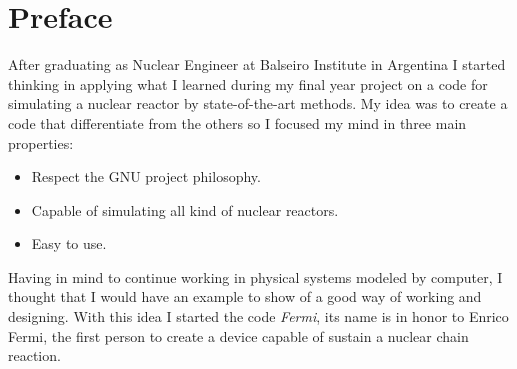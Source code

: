 \chapter*{Preface}

\par
After graduating as Nuclear Engineer at Balseiro Institute in Argentina I started thinking in applying what I learned during my final year project on a code for simulating a nuclear reactor by state-of-the-art methods. My idea was to create a code that differentiate from the others so I focused my mind in three main properties:
\begin{itemize}
 \item Respect the GNU project philosophy.
 \item Capable of simulating all kind of nuclear reactors.
 \item Easy to use.
\end{itemize}
Having in mind to continue working in physical systems modeled by computer, I thought that I would have an example to show of a good way of working and designing. With this idea I started the code \emph{Fermi}, its name is in honor to Enrico Fermi, the first person to create a device capable of sustain a nuclear chain reaction.




